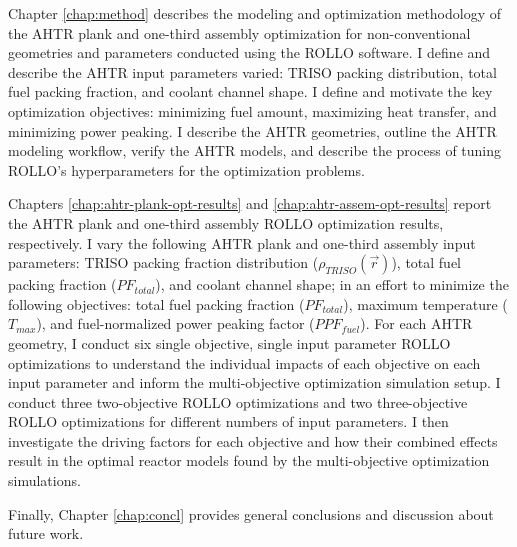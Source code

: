Chapter \ref{chap:method} describes the modeling and optimization methodology of the 
\gls{AHTR} plank and one-third assembly optimization for non-conventional 
geometries and parameters conducted using the \gls{ROLLO} software.
I define and describe the \gls{AHTR} input parameters varied: \gls{TRISO} packing 
distribution, total fuel packing fraction, and coolant channel shape.
I define and motivate the key optimization objectives: minimizing fuel amount,
maximizing heat transfer, and minimizing power peaking.
I describe the \gls{AHTR} geometries, outline the \gls{AHTR} modeling workflow, 
verify the \gls{AHTR} models, and describe the process of tuning \gls{ROLLO}'s 
hyperparameters for the optimization problems.

Chapters \ref{chap:ahtr-plank-opt-results} and \ref{chap:ahtr-assem-opt-results} 
report the \gls{AHTR} plank and one-third assembly \gls{ROLLO} optimization results, 
respectively. 
I vary the following \gls{AHTR} plank and one-third assembly input parameters: 
\gls{TRISO} packing fraction distribution ($\rho_{TRISO}(\vec{r})$), total fuel 
packing fraction ($PF_{total}$), and coolant channel shape; in an effort to minimize 
the following objectives: total fuel packing fraction ($PF_{total}$), maximum 
temperature ($T_{max}$), and fuel-normalized power peaking factor ($PPF_{fuel}$). 
For each \gls{AHTR} geometry, I conduct six single objective, single input parameter 
\gls{ROLLO} optimizations to understand the individual impacts of each objective on 
each input parameter and inform the multi-objective optimization simulation setup. 
I conduct three two-objective \gls{ROLLO} optimizations and two three-objective 
\gls{ROLLO} optimizations for different numbers of input parameters. 
I then investigate the driving factors for each objective and how their combined 
effects result in the optimal reactor models found by the multi-objective 
optimization simulations. 

Finally, Chapter \ref{chap:concl} provides general conclusions and discussion about 
future work. 